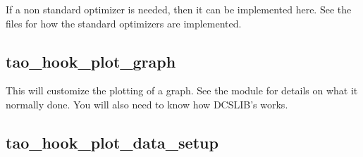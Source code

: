 If a non standard optimizer is needed, then it can be implemented
here. See the  files for how the
standard optimizers are implemented.

\subsection{tao\_hook\_plot\_graph}

This will customize the plotting of a graph. See the \tao module
 for details on what it normally done. You will also
need to know how DCSLIB's  works.

\subsection{tao\_hook\_plot\_data\_setup}

